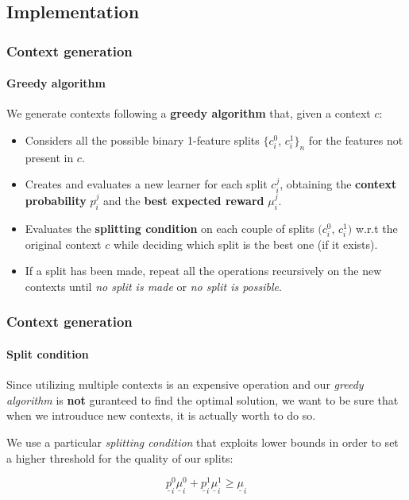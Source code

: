 \documentclass[11pt]{beamer}
\begin{document}

\subsection{Implementation}


\begin{frame}

\frametitle{Context generation}
\framesubtitle{Greedy algorithm}

We generate contexts following a \textbf{greedy algorithm} that, given a context $c$:

\begin{itemize}[label={*}]
    \item Considers all the possible binary 1-feature splits $\{c_i^0$, $c_i^1\}_n$ for the features not present in $c$.
    \item Creates and evaluates a new learner for each split $c_i^j$, obtaining the \textbf{context probability} $p_i^j$ and the \textbf{best expected reward} $\mu_i^j$.
    \item Evaluates the \textbf{splitting condition} on each couple of splits $(c_i^0$, $c_i^1)$ w.r.t the original context $c$ while deciding which split is the best one (if it exists).
    \item If a split has been made, repeat all the operations recursively on the new contexts until \textit{no split is made} or \textit{no split is possible}.
\end{itemize}

\end{frame}


\begin{frame}

\frametitle{Context generation}
\framesubtitle{Split condition}

Since utilizing multiple contexts is an expensive operation and our \textit{greedy algorithm} is \textbf{not} guranteed to find the optimal solution, we want to be sure that when we introuduce new contexts, it is actually worth to do so.

We use a particular \textit{splitting condition} that exploits lower bounds in order to set a higher threshold for the quality of our splits:

\begin{Large}
    \begin{displaymath}
        \underline{p}_i^0 \underline{\mu}_i^0 + \underline{p}_i^1 \underline{\mu}_i^1 \geq \underline{\mu}_i
    \end{displaymath}
\end{Large}

\end{frame}
\end{document}
